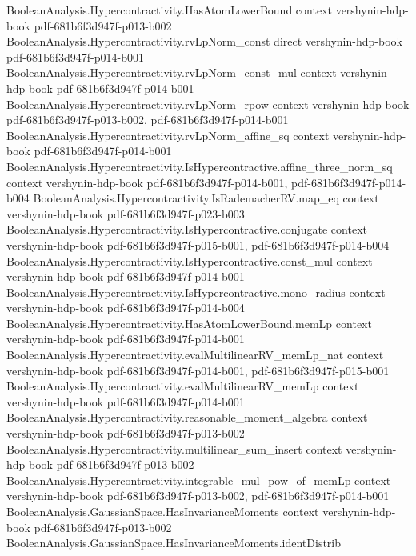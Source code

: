 \begin{theorem}
\proofstep
  {BooleanAnalysis.Hypercontractivity.HasAtomLowerBound}
  {context}
  {vershynin-hdp-book}
  {pdf-681b6f3d947f-p013-b002}
\proofstep
  {BooleanAnalysis.Hypercontractivity.rvLpNorm_const}
  {direct}
  {vershynin-hdp-book}
  {pdf-681b6f3d947f-p014-b001}
\proofstep
  {BooleanAnalysis.Hypercontractivity.rvLpNorm_const_mul}
  {context}
  {vershynin-hdp-book}
  {pdf-681b6f3d947f-p014-b001}
\proofstep
  {BooleanAnalysis.Hypercontractivity.rvLpNorm_rpow}
  {context}
  {vershynin-hdp-book}
  {pdf-681b6f3d947f-p013-b002,
    pdf-681b6f3d947f-p014-b001}
\proofstep
  {BooleanAnalysis.Hypercontractivity.rvLpNorm_affine_sq}
  {context}
  {vershynin-hdp-book}
  {pdf-681b6f3d947f-p014-b001}
\proofstep
  {BooleanAnalysis.Hypercontractivity.IsHypercontractive.affine_three_norm_sq}
  {context}
  {vershynin-hdp-book}
  {pdf-681b6f3d947f-p014-b001,
    pdf-681b6f3d947f-p014-b004}
\proofstep
  {BooleanAnalysis.Hypercontractivity.IsRademacherRV.map_eq}
  {context}
  {vershynin-hdp-book}
  {pdf-681b6f3d947f-p023-b003}
\proofstep
  {BooleanAnalysis.Hypercontractivity.IsHypercontractive.conjugate}
  {context}
  {vershynin-hdp-book}
  {pdf-681b6f3d947f-p015-b001,
    pdf-681b6f3d947f-p014-b004}
\proofstep
  {BooleanAnalysis.Hypercontractivity.IsHypercontractive.const_mul}
  {context}
  {vershynin-hdp-book}
  {pdf-681b6f3d947f-p014-b001}
\proofstep
  {BooleanAnalysis.Hypercontractivity.IsHypercontractive.mono_radius}
  {context}
  {vershynin-hdp-book}
  {pdf-681b6f3d947f-p014-b004}
\proofstep
  {BooleanAnalysis.Hypercontractivity.HasAtomLowerBound.memLp}
  {context}
  {vershynin-hdp-book}
  {pdf-681b6f3d947f-p014-b001}
\proofstep
  {BooleanAnalysis.Hypercontractivity.evalMultilinearRV_memLp_nat}
  {context}
  {vershynin-hdp-book}
  {pdf-681b6f3d947f-p014-b001,
    pdf-681b6f3d947f-p015-b001}
\proofstep
  {BooleanAnalysis.Hypercontractivity.evalMultilinearRV_memLp}
  {context}
  {vershynin-hdp-book}
  {pdf-681b6f3d947f-p014-b001}
\proofstep
  {BooleanAnalysis.Hypercontractivity.reasonable_moment_algebra}
  {context}
  {vershynin-hdp-book}
  {pdf-681b6f3d947f-p013-b002}
\proofstep
  {BooleanAnalysis.Hypercontractivity.multilinear_sum_insert}
  {context}
  {vershynin-hdp-book}
  {pdf-681b6f3d947f-p013-b002}
\proofstep
  {BooleanAnalysis.Hypercontractivity.integrable_mul_pow_of_memLp}
  {context}
  {vershynin-hdp-book}
  {pdf-681b6f3d947f-p013-b002,
    pdf-681b6f3d947f-p014-b001}
\proofstep
  {BooleanAnalysis.GaussianSpace.HasInvarianceMoments}
  {context}
  {vershynin-hdp-book}
  {pdf-681b6f3d947f-p013-b002}
\proofstep
  {BooleanAnalysis.GaussianSpace.HasInvarianceMoments.identDistrib}

\end{theorem}
